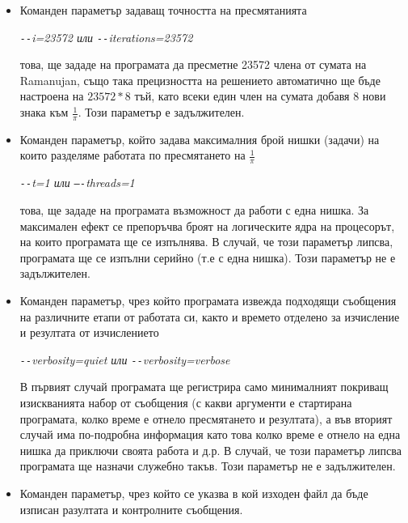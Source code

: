 \documentclass[a4paper,english]{article}
\begin{document}
\begin{itemize}
    \item Команден параметър задаващ точността на пресмятанията 
    
    \begin{center}
    \textit {\texttt{-{}-}i=23572 или \texttt{-{}-}iterations=23572}
    \end{center}
    
    това, ще зададе на програмата да пресметне 23572 члена от сумата на Ramanujan, също така прецизността на решението автоматично ще бъде настроена на \begin{math}23572 * 8\end{math} тъй, като всеки един член на сумата добавя 8 нови знака към \begin{math}\frac{1}{\pi}\end{math}. Този параметър е задължителен.
    \item Команден параметър, който задава максималния брой нишки (задачи) на които разделяме работата по пресмятането на \begin{math}\frac{1}{\pi}\end{math}
    
    \begin{center}
        \textit{\texttt{-{}-}t=1 или \texttt{–{}-}threads=1}
    \end{center} 
    
    това, ще зададе на програмата възможност да работи с една нишка. За максимален ефект се препоръчва броят на логическите ядра на процесорът, на които програмата ще се изпълнява. В случай, че този параметър липсва, програмата ще се изпълни серийно (т.е с една нишка). Този параметър не е задължителен.
    \item Команден параметър, чрез който програмата извежда подходящи съобщения на различните етапи от работата си, както и времето отделено за изчисление и резултата от изчислението 
    
    \begin{center}
        \textit{\texttt{-{}-}verbosity=quiet или \texttt{-{}-}verbosity=verbose}
    \end{center}
    
    В първият случай програмата ще регистрира само минималният покриващ изискванията набор от съобщения (с какви аргументи е стартирана програмата, колко време е отнело пресмятането и резултата), а във вторият случай има по-подробна информация като това колко време е отнело на една нишка да приключи своята работа и д.р. В случай, че този параметър липсва програмата ще назначи служебно такъв. Този параметър не е задължителен.
    \item  Команден параметър, чрез който се указва в кой изходен файл да бъде изписан разултата и контролните съобщения. 
    

\end{itemize}
\end{document}
